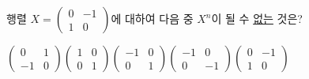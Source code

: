 \hspace*{2mm}\begin{minipage}[t]{\dimexpr\linewidth-2mm\relax}\vspace{0pt}
행렬 $X=\begin{pmatrix} 0 & -1 \\ 1 & 0 \end{pmatrix}$에 대하여 다음 중 $X^n$이 될 수 \underline{없는} 것은? 
\begin{choices32}{$\begin{pmatrix} 0 & 1 \\ -1 & 0 \end{pmatrix}$}{$\begin{pmatrix} 1 & 0 \\ 0 & 1 \end{pmatrix}$}{$\begin{pmatrix} -1 & 0 \\ 0 & 1 \end{pmatrix}$}{$\begin{pmatrix} -1 & 0 \\ 0 & -1 \end{pmatrix}$}{$\begin{pmatrix} 0 & -1 \\ 1 & 0 \end{pmatrix}$}\end{choices32}\end{minipage}
